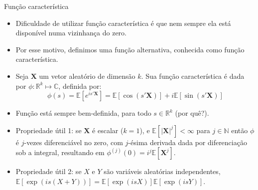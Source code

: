 \documentclass[11pt]{beamer}
\begin{document}
	\begin{frame}{Função característica}
		\begin{itemize}
			\item Dificuldade de utilizar função característica é que nem sempre ela está disponível numa vizinhança do zero.
			\item Por esse motivo, definimos uma função alternativa, conhecida como {\color{red}função característica}. 
			\item Seja $\boldsymbol{X}$ um vetor aleatório de dimensão $k$. Sua função característica é dada por $\phi: \mathbb{R}^k \mapsto \mathbb{C}$, definida por:
			\begin{equation*}
				\phi(s) = \mathbb{E}[e^{is'\boldsymbol{X}}] = \mathbb{E}[\cos(s'\boldsymbol{X})] + i \mathbb{E}[\sin(s'\boldsymbol{X})]
			\end{equation*} 
			\item Função está sempre bem-definida, para todo $s \in \mathbb{R}^k$ (por quê?).
			\item Propriedade útil 1: se $\boldsymbol{X}$ é escalar ($k=1$), e $\mathbb{E}[|\boldsymbol{X}|^j]<\infty$ para $j \in \mathbb{N}$ então $\phi$ é $j$-vezes diferenciável no zero, com $j$-ésima derivada dada por diferenciação sob a integral, resultando em $\phi^{(j)}(0) = i^j \mathbb{E}[\boldsymbol{X}^j]$.
			\item Propriedade útil 2: se $X$ e $Y$ são variáveis aleatórias independentes, $\mathbb{E}[\exp(is(X+Y))] = \mathbb{E}[\exp(isX)] \mathbb{E}[\exp(isY)]$. 
		\end{itemize}
	\end{frame}
	
\end{document}
